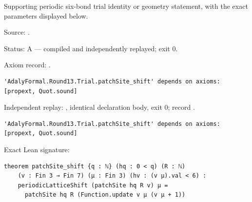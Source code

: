 \begin{theorem}[bp-346]
\label{bp-346}
\leanok
Supporting periodic six-bond trial identity or geometry statement, with the exact parameters displayed below.

\par Source: \texttt{}.
\par Status: A — compiled and independently replayed; exit 0.
\par Axiom record: \texttt{}.
\begin{verbatim}
'AdalyFormal.Round13.Trial.patchSite_shift' depends on axioms: [propext, Quot.sound]
\end{verbatim}
\par Independent replay: \texttt{}, identical declaration body, exit 0; record \texttt{}.
\begin{verbatim}
'AdalyFormal.Round13.Trial.patchSite_shift' depends on axioms: [propext, Quot.sound]
\end{verbatim}
\par Exact Lean signature:
\begin{verbatim}
theorem patchSite_shift {q : ℕ} (hq : 0 < q) (R : ℕ)
    (v : Fin 3 → Fin 7) (μ : Fin 3) (hv : (v μ).val < 6) :
    periodicLatticeShift (patchSite hq R v) μ =
      patchSite hq R (Function.update v μ (v μ + 1))
\end{verbatim}
\end{theorem}

